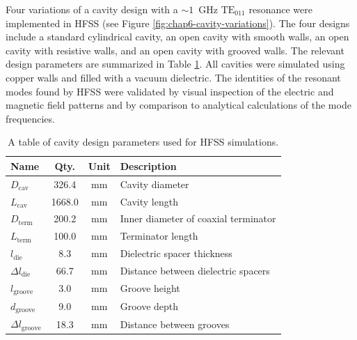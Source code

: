 Four variations of a cavity design with a $\sim 1$~GHz $\mathrm{TE}_{011}$ resonance were implemented in HFSS (see Figure \ref{fig:chap6-cavity-variations}). The four designs include a standard cylindrical cavity, an open cavity with smooth walls, an open cavity with resistive walls, and an open cavity with grooved walls. The relevant design parameters are summarized in Table \ref{tab:chap6-cavity-sim-params}. All cavities were simulated using copper walls and filled with a vacuum dielectric. The identities of the resonant modes found by HFSS were validated by visual inspection of the electric and magnetic field patterns and by comparison to analytical calculations of the mode frequencies.

\begin{table}[htbp]
    \centering
    \caption{\label{tab:chap6-cavity-sim-params} A table of cavity design parameters used for HFSS simulations.}
    \begin{tabular}{l|c|c|l}
        \hline
        Name & Qty. & Unit & Description \\
        \hline
        $D_\mathrm{cav}$ & 326.4 & mm & Cavity diameter\\
        $L_\mathrm{cav}$ & 1668.0 & mm & Cavity length\\
        $D_\mathrm{term}$ & 200.2 & mm & Inner diameter of coaxial terminator\\
        $L_\mathrm{term}$ & 100.0 & mm & Terminator length\\
        $l_\mathrm{die}$ & 8.3 & mm & Dielectric spacer thickness\\
        $\Delta l_\mathrm{die}$ & 66.7 & mm & Distance between dielectric spacers\\
        $l_\mathrm{groove}$ & 3.0 & mm & Groove height\\
        $d_\mathrm{groove}$ & 9.0 & mm & Groove depth\\
        $\Delta l_\mathrm{groove}$ & 18.3 & mm & Distance between grooves \\
        \hline
    \end{tabular}
\end{table}

